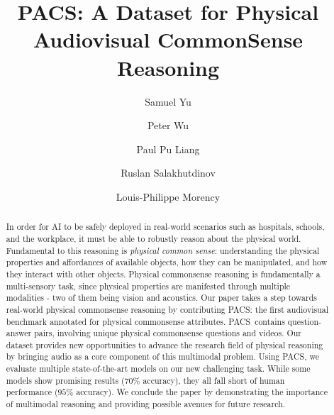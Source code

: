 \documentclass[runningheads]{llncs}
\newcommand{\names}{\textsc{PACS}}
\begin{document}
\pagestyle{headings}
\mainmatter
\def\ECCVSubNumber{5310}  

\title{\names: A Dataset for Physical Audiovisual CommonSense Reasoning}

\author{Samuel Yu\and
Peter Wu \and
Paul Pu Liang \and
Ruslan Salakhutdinov \and
Louis-Philippe Morency}



\maketitle


\begin{abstract}
In order for AI to be safely deployed in real-world scenarios such as hospitals, schools, and the workplace, it must be able to robustly reason about the physical world. Fundamental to this reasoning is \textit{physical common sense}: understanding the physical properties and affordances of available objects, how they can be manipulated, and how they interact with other objects. Physical commonsense reasoning is fundamentally a multi-sensory task, since physical properties are manifested through multiple modalities - two of them being vision and acoustics. Our paper takes a step towards real-world physical commonsense reasoning by contributing \names: the first audiovisual benchmark annotated for physical commonsense attributes. \names\ contains  question-answer pairs, involving  unique physical commonsense questions and  videos.
Our dataset provides new opportunities to advance the research field of physical reasoning by bringing audio as a core component of this multimodal problem.
Using \names, we evaluate multiple state-of-the-art models on our new challenging task. While some models show promising results ($70\%$ accuracy), they all fall short of human performance ($95\%$ accuracy). We conclude the paper by demonstrating the importance of multimodal reasoning and providing possible avenues for future research.


\end{abstract}
\end{document}
